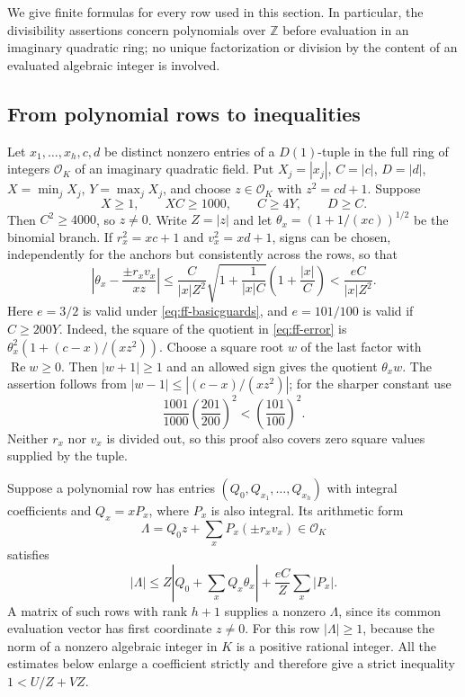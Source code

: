 \documentclass[12pt]{article}
\numberwithin{equation}{section}
\begin{document}
We give finite formulas for every row used in this section. In particular,
the divisibility assertions concern polynomials over $\mathbb Z$ before
evaluation in an imaginary quadratic ring; no unique factorization or
division by the content of an evaluated algebraic integer is involved.

\subsection{From polynomial rows to inequalities}

Let $x_1,\ldots,x_h,c,d$ be distinct nonzero entries of a $D(1)$-tuple
in the full ring of integers $\mathcal O_K$ of an imaginary quadratic
field. Put $X_j=|x_j|$, $C=|c|$, $D=|d|$,
$X=\min_jX_j$, $Y=\max_jX_j$, and choose $z\in\mathcal O_K$ with
$z^2=cd+1$. Suppose
\begin{equation}\label{eq:ff-basicguards}
 X\ge1,\qquad XC\ge1000,\qquad C\ge4Y,\qquad D\ge C.
\end{equation}
Then $C^2\ge4000$, so $z\ne0$. Write $Z=|z|$ and let
$\theta_x=(1+1/(xc))^{1/2}$ be the binomial branch.
If $r_x^2=xc+1$ and $v_x^2=xd+1$, signs can be chosen, independently
for the anchors but consistently across the rows, so that
\begin{equation}\label{eq:ff-error}
 \left|\theta_x-\frac{\pm r_xv_x}{xz}\right|
 \le \frac{C}{|x|Z^2}
       \sqrt{1+\frac1{|x|C}}\left(1+\frac{|x|}{C}\right)
 <\frac{eC}{|x|Z^2}.
\end{equation}
Here $e=3/2$ is valid under \eqref{eq:ff-basicguards}, and $e=101/100$
is valid if $C\ge200Y$. Indeed, the square of the quotient in
\eqref{eq:ff-error} is
$\theta_x^2(1+(c-x)/(xz^2))$.
Choose a square root $w$ of the last factor with $\operatorname{Re}w\ge0$.
Then $|w+1|\ge1$ and an allowed sign gives the quotient $\theta_xw$.
The assertion follows from $|w-1|\le|(c-x)/(xz^2)|$; for the sharper
constant use
\[
 \frac{1001}{1000}\left(\frac{201}{200}\right)^2
 <\left(\frac{101}{100}\right)^2.
\]
Neither $r_x$ nor $v_x$ is divided out, so this proof also covers zero
square values supplied by the tuple.

Suppose a polynomial row has entries $(Q_0,Q_{x_1},\ldots,Q_{x_h})$
with integral coefficients and $Q_x=xP_x$, where $P_x$ is also integral.
Its arithmetic form
\[
 \Lambda=Q_0z+\sum_xP_x(\pm r_xv_x)\in\mathcal O_K
\]
satisfies
\begin{equation}\label{eq:ff-master}
 |\Lambda|\le Z\left|Q_0+\sum_xQ_x\theta_x\right|
                 +\frac{eC}{Z}\sum_x|P_x|.
\end{equation}
A matrix of such rows with rank $h+1$ supplies a nonzero $\Lambda$,
since its common evaluation vector has first coordinate $z\ne0$.
For this row $|\Lambda|\ge1$, because the norm of a nonzero algebraic
integer in $K$ is a positive rational integer. All the estimates below
enlarge a coefficient strictly and therefore give a strict inequality
$1<U/Z+VZ$.
\end{document}
